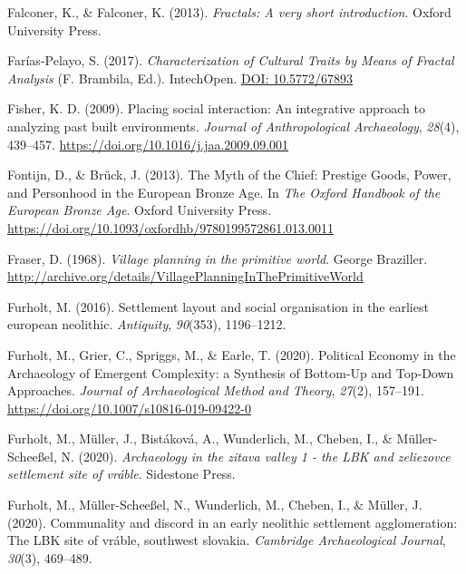 \documentclass[
  12pt,
]{book}
\newlength{\cslhangindent}
\newlength{\cslentryspacingunit} %
\newenvironment{CSLReferences}[2] %
 {%
  \setlength{\parindent}{0pt}
  \ifodd #1
  \let\oldpar\par
  \def\par{\hangindent=\cslhangindent\oldpar}
  \fi
  \setlength{\parskip}{#2\cslentryspacingunit}
 }%
 {}
\begin{document}
\begin{CSLReferences}{1}{0}
\leavevmode{}%
Falconer, K., \& Falconer, K. (2013). \emph{Fractals: A very short introduction}. Oxford University Press.

\leavevmode{}%
Farías-Pelayo, S. (2017). \emph{Characterization of Cultural Traits by Means of Fractal Analysis} (F. Brambila, Ed.). IntechOpen. \href{https://DOI:\%2010.5772/67893}{DOI: 10.5772/67893}

\leavevmode{}%
Fisher, K. D. (2009). Placing social interaction: An integrative approach to analyzing past built environments. \emph{Journal of Anthropological Archaeology}, \emph{28}(4), 439--457. \url{https://doi.org/10.1016/j.jaa.2009.09.001}

\leavevmode{}%
Fontijn, D., \& Brück, J. (2013). The {Myth} of the {Chief}: {Prestige Goods}, {Power}, and {Personhood} in the {European Bronze Age}. In \emph{The {Oxford Handbook} of the {European Bronze Age}}. {Oxford University Press}. \url{https://doi.org/10.1093/oxfordhb/9780199572861.013.0011}

\leavevmode{}%
Fraser, D. (1968). \emph{Village planning in the primitive world}. George Braziller. \url{http://archive.org/details/VillagePlanningInThePrimitiveWorld}

\leavevmode{}%
Furholt, M. (2016). Settlement layout and social organisation in the earliest european neolithic. \emph{Antiquity}, \emph{90}(353), 1196--1212.

\leavevmode{}%
Furholt, M., Grier, C., Spriggs, M., \& Earle, T. (2020). Political Economy in the Archaeology of Emergent Complexity: a Synthesis of Bottom-Up and Top-Down Approaches. \emph{Journal of Archaeological Method and Theory}, \emph{27}(2), 157--191. \url{https://doi.org/10.1007/s10816-019-09422-0}

\leavevmode{}%
Furholt, M., Müller, J., Bistáková, A., Wunderlich, M., Cheben, I., \& Müller-Scheeßel, N. (2020). \emph{Archaeology in the zitava valley 1 - the LBK and zeliezovce settlement site of vráble}. Sidestone Press.

\leavevmode{}%
Furholt, M., Müller-Scheeßel, N., Wunderlich, M., Cheben, I., \& Müller, J. (2020). Communality and discord in an early neolithic settlement agglomeration: The LBK site of vráble, southwest slovakia. \emph{Cambridge Archaeological Journal}, \emph{30}(3), 469--489.


\end{CSLReferences}
\end{document}
